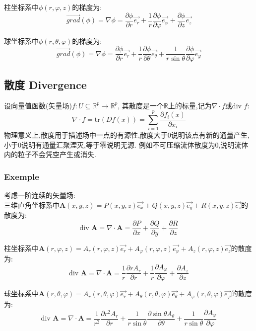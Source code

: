 \documentclass[12pt, a4paper, oneside]{ctexbook}
\begin{document}
    柱坐标系中$\phi(r,\varphi ,z)$的梯度为:
    $$
    \overrightarrow{grad} (\phi)=\nabla \phi=\frac{\partial \phi}{\partial r}\overrightarrow{e_r}+\frac{1}{r}\frac{\partial \phi}{\partial \varphi}\overrightarrow{e_\varphi}+\frac{\partial \phi}{\partial z}\overrightarrow{e_z}
    $$

    球坐标系中$\phi(r,\theta,\varphi)$的梯度为:
    $$
      \overrightarrow{grad} (\phi)=\nabla \phi=\frac{\partial \phi}{\partial r}\overrightarrow{e_r}+\frac{1}{r}\frac{\partial \phi}{\partial \theta}\overrightarrow{e_\theta}+\frac{1}{r\sin\theta}\frac{\partial \phi}{\partial \varphi}\overrightarrow{e_\varphi}
    $$
  \subsection{散度 Divergence}
    设向量值函数(矢量场)$f:U\subseteq \mathbb{R}^p \rightarrow \mathbb{R}^p$,
    其散度是一个$\mathbb{R}$上的标量,记为$\nabla \cdot f$或$\text{div }f$:
    $$
      \nabla \cdot f=\text{tr}(Df(x))=\sum_{i=1}^{p}\frac{\partial f_i(x)}{\partial x_i}
    $$
    物理意义上,散度用于描述场中一点的有源性,散度大于0说明该点有新的通量产生,小于0说明有通量汇聚湮灭,等于零说明无源.
    例如不可压缩流体散度为0,说明流体内的粒子不会凭空产生或消失.
    \subsubsection{Exemple}
    考虑一阶连续的矢量场:\\


    三维直角坐标系中$\textbf{A}(x,y,z)=P(x,y,z)\overrightarrow{e_x}+Q(x,y,z)\overrightarrow{e_y}+R(x,y,z)\overrightarrow{e_z}$的散度为:
    $$
      \text{div } \textbf{A}=\nabla \cdot \textbf{A}=\frac{\partial P}{\partial x}+\frac{\partial Q}{\partial y}+\frac{\partial R}{\partial z}
    $$

    柱坐标系中$\textbf{A}(r,\varphi ,z)=A_r(r,\varphi ,z)\overrightarrow{e_r}+A_\varphi(r,\varphi ,z)\overrightarrow{e_\varphi}+A_z(r,\varphi ,z)\overrightarrow{e_z}$的散度为:
    $$
      \text{div } \textbf{A}=\nabla \cdot \textbf{A}=\frac{1}{r}\frac{\partial rA_r}{\partial r}+\frac{1}{r}\frac{\partial A_\varphi}{\partial \varphi}+\frac{\partial A_z}{\partial z}
    $$

    球坐标系中$\textbf{A}(r,\theta ,\varphi)=A_r(r,\theta ,\varphi)\overrightarrow{e_r}+A_\theta(r,\theta ,\varphi)\overrightarrow{e_\theta}+A_\varphi(r,\theta ,\varphi)\overrightarrow{e_\varphi}$的散度为:
    $$
      \text{div } \textbf{A}=\nabla \cdot \textbf{A}=\frac{1}{r^2}\frac{\partial r^2A_r}{\partial r}+\frac{1}{r\sin \theta}\frac{\partial\sin\theta A_\theta}{\partial \theta}+\frac{1}{r\sin\theta}\frac{\partial A_\varphi}{\partial\varphi}
    $$
\end{document}
